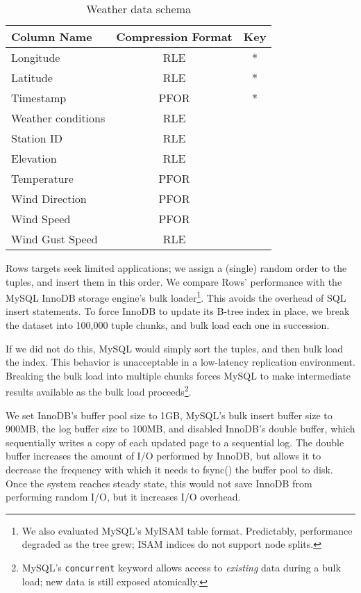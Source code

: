 \documentclass{sig-alternate-sigmod08}
\newcommand{\rows}{Rows\xspace}
\newcommand{\rowss}{Rows'\xspace}
\begin{document}
\begin{table}
\caption{Weather data schema}
\centering
\label{tab:schema}
\begin{tabular}{|l|c|c|} \hline
Column Name     & Compression Format &  Key \\ \hline
Longitude       & RLE       & *       \\ \hline
Latitude        & RLE       & *       \\\hline
Timestamp       & PFOR       & *       \\\hline
Weather conditions& RLE       &        \\\hline
Station ID        & RLE       &        \\\hline
Elevation        & RLE       &        \\\hline
Temperature      & PFOR       &        \\\hline
Wind Direction        & PFOR       &        \\\hline
Wind Speed        & PFOR       &        \\\hline
Wind Gust Speed   & RLE       &        \\
\hline\end{tabular}
\end{table}
\rows targets seek limited applications; we assign a (single) random
order to the tuples, and insert them in this order.  We compare \rowss
performance with the MySQL InnoDB storage engine's bulk
loader\footnote{We also evaluated MySQL's MyISAM table format.
  Predictably, performance degraded as the tree grew; ISAM indices do not
  support node splits.}.  This avoids the overhead of SQL insert
statements.  To force InnoDB to update its B-tree index in place, we
break the dataset into 100,000 tuple chunks, and bulk load each one in
succession.

If we did not do this, MySQL would simply sort the tuples, and then
bulk load the index.  This behavior is unacceptable in a low-latency
replication environment.  Breaking the bulk load into multiple chunks
forces MySQL to make intermediate results available as the bulk load
proceeds\footnote{MySQL's {\tt concurrent} keyword allows access to
  {\em existing} data during a bulk load; new data is still exposed
  atomically.}.

We set InnoDB's buffer pool size to 1GB, MySQL's bulk insert buffer
size to 900MB, the log buffer size to 100MB, and disabled InnoDB's
double buffer, which sequentially writes a copy of each updated page
to a sequential log.  The double buffer increases the amount of I/O
performed by InnoDB, but allows it to decrease the frequency with
which it needs to fsync() the buffer pool to disk.  Once the system
reaches steady state, this would not save InnoDB from performing
random I/O, but it increases I/O overhead.
\end{document}

